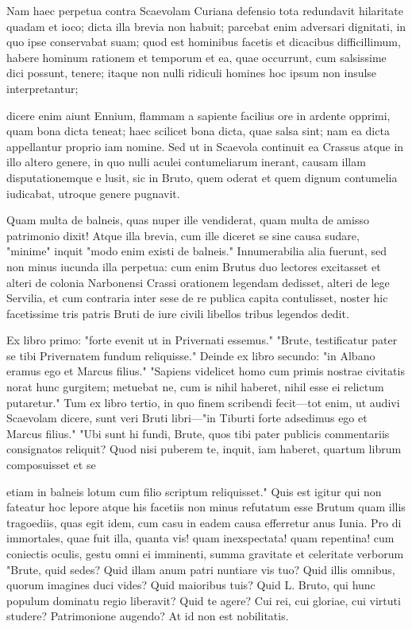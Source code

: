  Nam haec perpetua contra Scaevolam Curiana defensio tota redundavit hilaritate quadam et ioco; dicta illa brevia non habuit; parcebat enim adversari dignitati, in quo ipse conservabat suam; quod est hominibus facetis et dicacibus difficillimum, habere hominum rationem et temporum et ea, quae occurrunt, cum salsissime dici possunt, tenere; itaque non nulli ridiculi homines hoc ipsum non insulse interpretantur;

 dicere enim aiunt Ennium, flammam a sapiente facilius ore in ardente opprimi, quam bona dicta teneat; haec scilicet bona dicta, quae salsa sint; nam ea dicta appellantur proprio iam nomine. Sed ut in Scaevola continuit ea Crassus atque in illo altero genere, in quo nulli aculei contumeliarum inerant, causam illam disputationemque e lusit, sic in Bruto, quem oderat et quem dignum contumelia iudicabat, utroque genere pugnavit.

 Quam multa de balneis, quas nuper ille vendiderat, quam multa de amisso patrimonio dixit! Atque illa brevia, cum ille diceret se sine causa sudare, "minime" inquit "modo enim existi de balneis." Innumerabilia alia fuerunt, sed non minus iucunda illa perpetua: cum enim Brutus duo lectores excitasset et alteri de colonia Narbonensi Crassi orationem legendam dedisset, alteri de lege Servilia, et cum contraria inter sese de re publica capita contulisset, noster hic facetissime tris patris Bruti de iure civili libellos tribus legendos dedit.

 Ex libro primo: "forte evenit ut in Privernati essemus." "Brute, testificatur pater se tibi Privernatem fundum reliquisse." Deinde ex libro secundo: "in Albano eramus ego et Marcus filius." "Sapiens videlicet homo cum primis nostrae civitatis norat hunc gurgitem; metuebat ne, cum is nihil haberet, nihil esse ei relictum putaretur." Tum ex libro tertio, in quo finem scribendi fecit—tot enim, ut audivi Scaevolam dicere, sunt veri Bruti libri—"in Tiburti forte adsedimus ego et Marcus filius." "Ubi sunt hi fundi, Brute, quos tibi pater publicis commentariis consignatos reliquit? Quod nisi puberem te, inquit, iam haberet, quartum librum composuisset et se

 etiam in balneis lotum cum filio scriptum reliquisset." Quis est igitur qui non fateatur hoc lepore atque his facetiis non minus refutatum esse Brutum quam illis tragoediis, quas egit idem, cum casu in eadem causa efferretur anus Iunia. Pro di immortales, quae fuit illa, quanta vis! quam inexspectata! quam repentina! cum coniectis oculis, gestu omni ei imminenti, summa gravitate et celeritate verborum "Brute, quid sedes? Quid illam anum patri nuntiare vis tuo? Quid illis omnibus, quorum imagines duci vides? Quid maioribus tuis? Quid L. Bruto, qui hunc populum dominatu regio liberavit? Quid te agere? Cui rei, cui gloriae, cui virtuti studere? Patrimonione augendo? At id non est nobilitatis.

